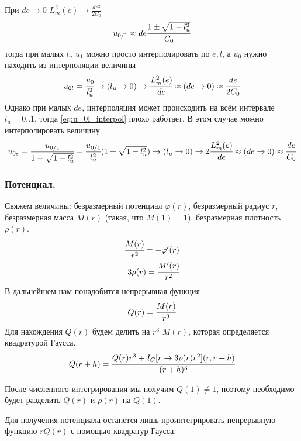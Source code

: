\documentclass[a4paper, 14pt]{article}
\begin{document}
	При $de \rightarrow 0$ $L_m^2(e) \rightarrow \frac{de^2}{2C_0}$
	\begin{equation}
		u_{0/1} \approx de\cfrac{1 \pm \sqrt{1-l_u^2} }{C_0}
	\end{equation}
	тогда при малых $l_u$ $u_1$ можно просто интерполировать по $e,l$, а $u_0$ нужно находить из интерполяции величины
	\begin{equation}
		u_{0l} = \cfrac{u_0}{l_u^2} \rightarrow (l_u \rightarrow 0) \rightarrow 
		\cfrac{L_m^2(e)}{de} \approx (de \rightarrow 0) \approx \cfrac{de}{2 C_0}
		\label{eq:u_0l_interpol}
	\end{equation}
	Однако при малых $de$, интерполяция может происходить на всём интервале $l_u = 0..1$. тогда \ref{eq:u_0l_interpol} плохо работает. В этом случае можно интерполировать величину
	\begin{equation}
		u_{0s} = \cfrac{u_{0/1}}{1 - \sqrt{1-l_u^2}} =  \cfrac{u_{0/1}}{l_u^2} (1 + \sqrt{1-l_u^2})  \rightarrow (l_u \rightarrow 0) \rightarrow 
		2\cfrac{L_m^2(e)}{de} \approx (de \rightarrow 0) \approx \cfrac{de}{C_0}
		\label{eq:u_0l_soph_interpol}
	\end{equation}
\fi
		
	\subsubsection{Потенциал.}
	Свяжем величины: безразмерный потенциал $\varphi(r)$, безразмерный радиус $r$, безразмерная масса $M(r)$ (такая, что $M(1) = 1$), безразмерная плотность $\rho(r)$.
	\begin{eqnarray*}
		\cfrac{M(r)}{r^2} = -\varphi'(r) \\
		3\rho(r) = \cfrac{M'(r)}{r^2}
	\end{eqnarray*}
	В дальнейшем нам понадобится непрерывная функция 
	\begin{equation}
		Q(r) = \cfrac{M(r)}{r^3}
	\end{equation}	
	Для нахождения $Q(r)$ будем делить на $r^3$ $M(r)$, которая определяется квадратурой Гаусса.
	\begin{equation}
		Q(r+h) = \cfrac{Q(r)r^3 + I_G[r \rightarrow  3\rho(r)r^2](r,r+h)}{(r+h)^3}
	\end{equation}
	
	После численного интегрирования мы получим $Q(1) \ne 1$, поэтому необходимо будет разделить $Q(r)$ и $\rho(r)$ на $Q(1)$.
	
	Для получения потенциала останется лишь проинтегрировать непрерывную функцию $rQ(r)$ с помощью квадратур Гаусса.
	
\end{document}
